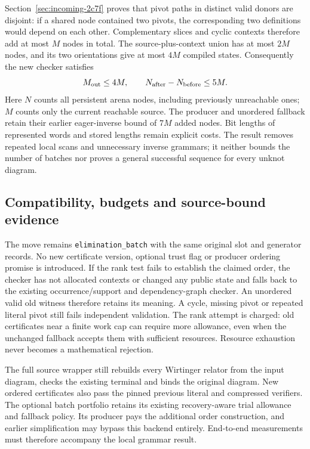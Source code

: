 Section~\ref{sec:incoming-2c7f} proves that pivot paths in distinct valid donors
are disjoint: if a shared node contained two pivots, the corresponding two
definitions would depend on each other. Complementary slices and cyclic
contexts therefore add at most $M$ nodes in total. The source-plus-context
union has at most $2M$ nodes, and its two orientations give at most $4M$
compiled states. Consequently the new checker satisfies
\[
 M_{\rm out}\le4M,\qquad
 N_{\rm after}-N_{\rm before}\le5M.
\]
Here $N$ counts all persistent arena nodes, including previously unreachable
ones; $M$ counts only the current reachable source. The producer and unordered
fallback retain their earlier eager-inverse bound of $7M$ added nodes.
Bit lengths of represented words and stored lengths remain explicit costs.
The result removes repeated local scans and unnecessary inverse grammars;
it neither bounds the number of batches nor proves a general successful
sequence for every unknot diagram.

\subsection{Compatibility, budgets and source-bound evidence}

The move remains \texttt{elimination\_batch} with the same original slot and
generator records. No new certificate version, optional trust flag or producer
ordering promise is introduced. If the rank test fails to establish the claimed
order, the checker has not allocated contexts or changed any public state and
falls back to the existing occurrence/support and dependency-graph checker.
An unordered valid old witness therefore retains its meaning. A cycle,
missing pivot or repeated literal pivot still fails independent validation.
The rank attempt is charged: old certificates near a finite work cap can
require more allowance, even when the unchanged fallback accepts them with
sufficient resources. Resource exhaustion never becomes a mathematical rejection.

The full source wrapper still rebuilds every Wirtinger relator from the input
diagram, checks the existing terminal and binds the original diagram. New
ordered certificates also pass the pinned previous literal and compressed
verifiers. The optional batch portfolio retains its existing recovery-aware
trial allowance and fallback policy. Its producer pays the additional order
construction, and earlier simplification may bypass this backend entirely.
End-to-end measurements must therefore accompany the local grammar result.


